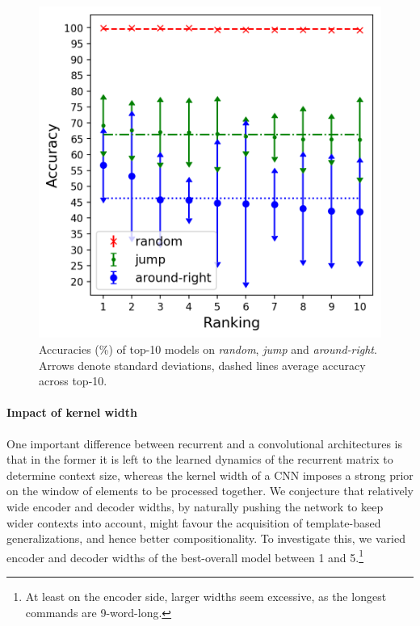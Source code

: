 \begin{figure}[tb]
    \includegraphics[width=.45\textwidth,keepaspectratio]{figures/accuracies_all_splits.png}
    \centering
    \caption{Accuracies (\%) of top-10 models on \emph{random}, \emph{jump} and \emph{around-right}. Arrows
      denote standard deviations, dashed lines average accuracy across top-10.
      }
    \label{fig:exp1}
\end{figure}

\paragraph{Impact of kernel width}
\label{subsec:exp2}

One important difference between recurrent and a convolutional
architectures is that in the former it is left to the learned dynamics
of the recurrent matrix to determine context size, whereas the kernel
width of a CNN imposes a strong prior on the window of elements to be
processed together. We conjecture that relatively wide encoder and
decoder widths, by naturally pushing the network to keep wider
contexts into account, might favour the acquisition of template-based
generalizations, and hence better compositionality. To investigate
this, we varied encoder and decoder widths of the best-overall model
between 1 and 5.\footnote{At least on the encoder side, larger widths
  seem excessive, as the longest commands are 9-word-long.}


